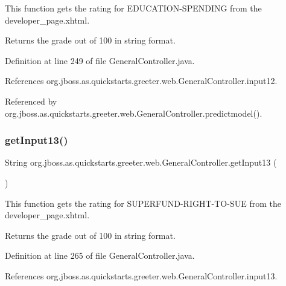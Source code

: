 This function gets the rating for E\+D\+U\+C\+A\+T\+I\+O\+N-\/\+S\+P\+E\+N\+D\+I\+NG from the developer\+\_\+page.\+xhtml. 

\begin{DoxyReturn}{Returns}
the grade out of 100 in string format. 
\end{DoxyReturn}


Definition at line 249 of file General\+Controller.\+java.



References org.\+jboss.\+as.\+quickstarts.\+greeter.\+web.\+General\+Controller.\+input12.



Referenced by org.\+jboss.\+as.\+quickstarts.\+greeter.\+web.\+General\+Controller.\+predictmodel().

\mbox{\label{classorg_1_1jboss_1_1as_1_1quickstarts_1_1greeter_1_1web_1_1_general_controller_af649b9e889e4918d3f86e255b796e82a}} 
\subsubsection{\texorpdfstring{get\+Input13()}{getInput13()}}
{\footnotesize\ttfamily String org.\+jboss.\+as.\+quickstarts.\+greeter.\+web.\+General\+Controller.\+get\+Input13 (\begin{DoxyParamCaption}{ }\end{DoxyParamCaption})}



This function gets the rating for S\+U\+P\+E\+R\+F\+U\+N\+D-\/\+R\+I\+G\+H\+T-\/\+T\+O-\/\+S\+UE from the developer\+\_\+page.\+xhtml. 

\begin{DoxyReturn}{Returns}
the grade out of 100 in string format. 
\end{DoxyReturn}


Definition at line 265 of file General\+Controller.\+java.



References org.\+jboss.\+as.\+quickstarts.\+greeter.\+web.\+General\+Controller.\+input13.



